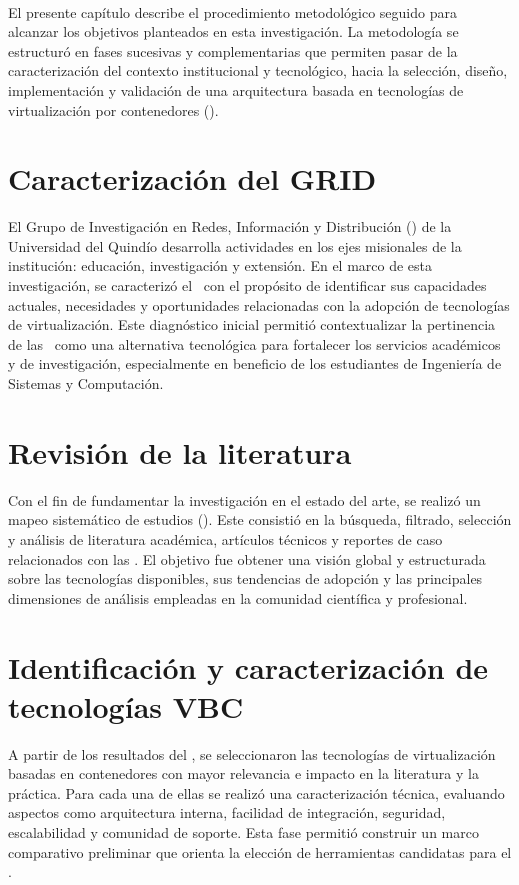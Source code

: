 \label{cap:desarrolloMetodologico}
\mbox{}\\
El presente capítulo describe el procedimiento metodológico seguido para alcanzar los objetivos planteados en esta investigación. La metodología se estructuró en fases sucesivas y complementarias que permiten pasar de la caracterización del contexto institucional y tecnológico, hacia la selección, diseño, implementación y validación de una arquitectura basada en tecnologías de virtualización por contenedores (\VBC).

\section{Caracterización del GRID}
El Grupo de Investigación en Redes, Información y Distribución (\GRID) de la Universidad del Quindío desarrolla actividades en los ejes misionales de la institución: educación, investigación y extensión. En el marco de esta investigación, se caracterizó el \GRID\ con el propósito de identificar sus capacidades actuales, necesidades y oportunidades relacionadas con la adopción de tecnologías de virtualización. Este diagnóstico inicial permitió contextualizar la pertinencia de las \VBC\ como una alternativa tecnológica para fortalecer los servicios académicos y de investigación, especialmente en beneficio de los estudiantes de Ingeniería de Sistemas y Computación.

\section{Revisión de la literatura}
Con el fin de fundamentar la investigación en el estado del arte, se realizó un mapeo sistemático de estudios (\SMS). Este consistió en la búsqueda, filtrado, selección y análisis de literatura académica, artículos técnicos y reportes de caso relacionados con las \VBC. El objetivo fue obtener una visión global y estructurada sobre las tecnologías disponibles, sus tendencias de adopción y las principales dimensiones de análisis empleadas en la comunidad científica y profesional.

\section{Identificación y caracterización de tecnologías VBC}
A partir de los resultados del \SMS, se seleccionaron las tecnologías de virtualización basadas en contenedores con mayor relevancia e impacto en la literatura y la práctica. Para cada una de ellas se realizó una caracterización técnica, evaluando aspectos como arquitectura interna, facilidad de integración, seguridad, escalabilidad y comunidad de soporte. Esta fase permitió construir un marco comparativo preliminar que orienta la elección de herramientas candidatas para el \GRID.

